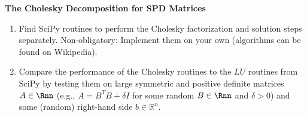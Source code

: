 \textbf{The Cholesky Decomposition for SPD Matrices}

\begin{enumerate}
	\item Find SciPy routines to perform the Cholesky factorization and solution steps separately. Non-obligatory: Implement them on your own (algorithms can be found on Wikipedia).
	\item Compare the performance of the Cholesky routines to the $LU$ routines from SciPy by testing them on large symmetric and positive definite matrices $A \in \Rnn$ (e.g., $A = B^TB + \delta I$ for some random $B\in \Rnn$ and $\delta >0$) and some (random) right-hand side $b \in \mathbb{R}^n$. 
\end{enumerate}

